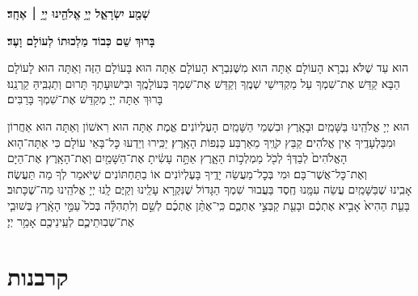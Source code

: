 \begin{Large}
	\textbf{שְׁמַ֖ע יִשְׂרָאֵ֑ל יְיָ֥ אֱלֹהֵ֖ינוּ יְיָ֥ ׀ אֶחָֽד׃}
\end{Large}

\textbf{%
	בָּרוּךְ שֵׁם כְּבוֹד מַלְכוּתוֹ לְעוֹלָם וָעֶד׃
}


הוּא עַד שֶׁלֹּא נִבְרָא הָעוֹלָם אַתָּה הוּא מִשֶּׁנִּבְרָא הָעוֹלָם \middot אַתָּה הוּא בָּעוֹלָם הַזֶּה וְאַתָּה הוּא לָעוֹלָם הַבָּא \middot קַדֵּשׁ אֶת־שִׁמְךָ עַל מַקְדִּישֵׁי שְׁמֶֽךָ וְקַדֵּשׁ אֶת־שִׁמְךָ בְּעוֹלָמֶֽךָ וּבִישׁוּעָתְךָ תָּרוּם וְתַגְבִּֽיהַּ קַרְנֵֽנוּ׃ בָּרוּךְ אַתָּה יְיָ מְקַדֵּשׁ אֶת־שִׁמְךָ בָּרַבִּים׃

הוּא יְיָ אֱלֹהֵֽינוּ בַּשָּׁמַֽיִם וּבָאָֽרֶץ וּבִשְׁמֵי הַשָּׁמַֽיִם הָעֶלְיוֹנִים׃ אֱמֶת אַתָּה הוּא רִאשׁוֹן וְאַתָּה הוּא אַחֲרוֹן וּמִבַּלְעָדֶֽיךָ אֵין אֱלֹהִים׃ קַבֵּץ קֹוֶֽיךָ מֵאַרְבַּע כַּנְפוֹת הָאָֽרֶץ׃ יַכִּֽירוּ וְיֵדְעוּ כׇּל־בָּאֵי עוֹלָם
כִּי אַתָּה־ה֤וּא הָאֱלֹהִים֙ לְבַדְּךָ֔ לְכֹ֖ל מַמְלְכ֣וֹת הָאָ֑רֶץ אַתָּ֣ה עָשִׂ֔יתָ אֶת־הַשָּׁמַ֖יִם וְאֶת־הָאָֽרֶץ׃ אֶת־הַיָּם וְאֶת־כׇּל־אֲשֶׁר־בָּם׃
וּמִי בְּכׇל־מַעֲשֵׂה יָדֶֽיךָ בָּעֶלְיוֹנִים אוֹ בַתַּחְתּוֹנִים שֶׁיֹּאמַר לְךָ מַה תַּעֲשֶׂה׃\\
אָבִֽינוּ שֶׁבַּשָּׁמַֽיִם עֲשֵׂה עִמָּֽנוּ חֶֽסֶד בַּעֲבוּר שִׁמְךָ הַגָּדוֹל שֶׁנִּקְרָא עָלֵֽינוּ וְקַיֶּם לָֽנוּ יְיָ אֱלֹהֵֽינוּ מַה־שֶׁכָּתוּב׃ %
בָּעֵ֤ת הַהִיא֙ אָבִ֣יא אֶתְכֶ֔ם וּבָעֵ֖ת קַבְּצִ֣י אֶתְכֶ֑ם כִּֽי־אֶתֵּ֨ן אֶתְכֶ֜ם לְשֵׁ֣ם וְלִתְהִלָּ֗ה בְּכֹל֙ עַמֵּ֣י הָאָֽ֔רֶץ בְּשׁוּבִ֧י אֶת־שְׁבֽוּתֵיכֶ֛ם לְעֵֽינֵיכֶ֖ם אָמַ֥ר יְיָ׃

\section[קרבנות]{ קרבנות }

